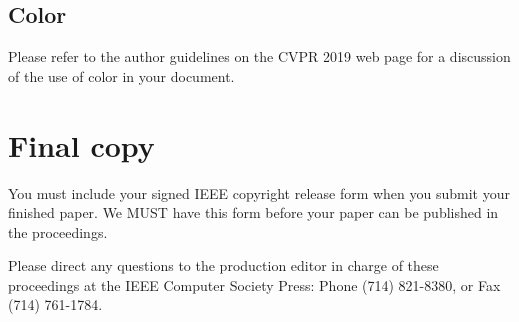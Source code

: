 \documentclass[10pt,twocolumn,letterpaper]{article}
\begin{document}
\subsection{Color}

Please refer to the author guidelines on the CVPR 2019 web page for a discussion
of the use of color in your document.

\section{Final copy}

You must include your signed IEEE copyright release form when you submit
your finished paper. We MUST have this form before your paper can be
published in the proceedings.

Please direct any questions to the production editor in charge of these
proceedings at the IEEE Computer Society Press: Phone (714) 821-8380, or
Fax (714) 761-1784.

{\small


}
\end{document}
